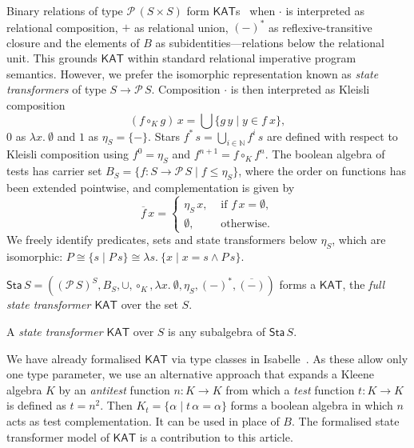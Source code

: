 \documentclass[envcountsame,envcountsect]{llncs}
\newcommand{\KAT}{\mathsf{KAT}}
\newcommand{\Pow}{\mathcal{P}}
\newcommand{\sta}{\mathsf{Sta}}
\begin{document}
Binary relations of type $\Pow\, (S\times S)$ form
$\KAT$s~\cite{Kozen97} when $\cdot$ is interpreted as
relational composition, $+$ as relational union, $(-)^\ast$
as reflexive-transitive closure and the elements of $B$ as
subidentities---relations below the relational unit. This
grounds $\KAT$ within standard relational imperative program
semantics. However, we prefer the isomorphic representation known
as \emph{state transformers} of type $S\to \Pow\, S$.
Composition $\cdot$ is then interpreted as Kleisli
composition
\begin{equation*} 
(f\circ_K g)\, x = \bigcup\{g\, y\mid y \in f\ x \}, 
\end{equation*} 
$0$ as $\lambda x.\ \emptyset$ and $1$ as $\eta_S = \{-\}$.  Stars
$f^{\ast}\, s  = \bigcup_{i\in\mathbb{N}} f^i\, s$ are defined with
  respect to Kleisli composition using $f^{0} = \eta_S$ and
  $f^{n+1} = f \circ_K f^{n}$. The boolean algebra of tests has
  carrier set $B_S=\{f:S\to \Pow\, S \mid f\le \eta_S\}$, where the
  order on functions has been extended pointwise,  and complementation
  is given by
  \begin{equation*} 
    \overline{f}\, x =
  \begin{cases}
    \eta_S\, x, & \text{ if } f\, x = \emptyset,\\
\emptyset, & \text{ otherwise}.
  \end{cases}
\end{equation*}
We freely identify predicates, sets and state 
transformers below $\eta_S$, which are isomorphic:
$P\cong \{s\mid P\, s\}\cong \lambda s.\ \{x\mid x=s \land P\, s\}$.

\begin{proposition}\label{P:kleisli-ka}
$\sta\, S = ((\Pow\, S)^S,B_S,\cup,\circ_K,\lambda x.\
  \emptyset, \eta_S,(-)^{\ast},\overline{(-)})$
  forms a $\KAT$, the \emph{full state transformer $\KAT$} over the
  set $S$.
\end{proposition}
A \emph{state transformer $\KAT$} over $S$ is any subalgebra of
$\sta\, S$. 

We have already formalised $\KAT$ via type classes in
Isabelle~\cite{afp:kat}.  As these allow only one type parameter, we
use an alternative approach that expands a Kleene algebra $K$ by an
\emph{antitest} function $n:K\to K$ from which a \emph{test} function
$t:K\to K$ is defined as $t=n^2$. Then
$K_t = \{\alpha \mid t\, \alpha = \alpha\}$ forms a boolean algebra in
which $n$ acts as test complementation. It can be used in place of
$B$.  The formalised state transformer model of $\KAT$ is a
contribution to this article.
\end{document}
